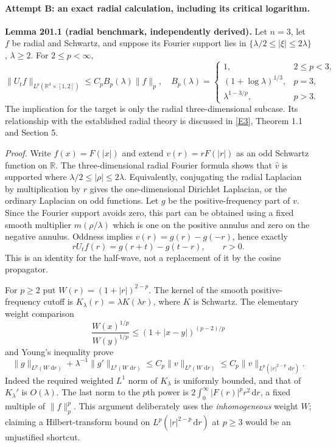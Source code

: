 \documentclass[11pt]{article}
\newcommand{\R}{\mathbb{R}}
\newcommand{\dd}{\,\mathrm d}
\newcommand{\eref}[2]{\hyperlink{extra:#1:#2}{[E#2]}}
\begin{document}
	\paragraph{Attempt B: an exact radial calculation, including its critical logarithm.}
	\textbf{Lemma 201.1 (radial benchmark, independently derived).}
	Let $n=3$, let $f$ be radial and Schwartz, and suppose its Fourier support
	lies in $\{\lambda/2\leq|\xi|\leq2\lambda\}$, $\lambda\geq2$.
	For $2\leq p<\infty$,
	\begin{equation}\label{ra30004844:radialbound}
		\|U_tf\|_{L^p(\R^3\times[1,2])}
		\leq C_p B_p(\lambda)\|f\|_p,
		\quad
		B_p(\lambda)=
		\begin{cases}
			1,&2\leq p<3,\\
			(1+\log\lambda)^{1/3},&p=3,\\
			\lambda^{1-3/p},&p>3.
		\end{cases}
	\end{equation}
	The implication for the target is only the radial three-dimensional
	subcase. Its relationship with the established radial theory is discussed
	in \eref{30004844}{3}, Theorem 1.1 and Section 5.
	
	\emph{Proof.}
	Write $f(x)=F(|x|)$ and extend $v(r)=rF(|r|)$ as an odd Schwartz
	function on $\R$. The three-dimensional radial Fourier formula shows
	that $\widehat v$ is supported where
	$\lambda/2\leq|\rho|\leq2\lambda$. Equivalently, conjugating the radial
	Laplacian by multiplication by $r$ gives the one-dimensional Dirichlet
	Laplacian, or the ordinary Laplacian on odd functions. Let $g$ be the
	positive-frequency part of $v$. Since the Fourier support avoids zero,
	this part can be obtained using a fixed smooth multiplier
	$m(\rho/\lambda)$ which is one on the positive annulus and zero on the
	negative annulus. Oddness implies $v(r)=g(r)-g(-r)$, hence exactly
	\begin{equation}\label{ra30004844:radialidentity}
		rU_tf(r)=g(r+t)-g(t-r),\qquad r>0.
	\end{equation}
	This is an identity for the half-wave, not a replacement of it by the
	cosine propagator.
	
	For $p\geq2$ put $W(r)=(1+|r|)^{2-p}$. The kernel of the smooth
	positive-frequency cutoff is $K_\lambda(r)=\lambda K(\lambda r)$,
	where $K$ is Schwartz. The elementary weight comparison
	\[
	\frac{W(x)^{1/p}}{W(y)^{1/p}}
	\leq (1+|x-y|)^{(p-2)/p}
	\]
	and Young's inequality prove
	\begin{equation}\label{ra30004844:weightedcutoff}
		\|g\|_{L^p(W\,\dd r)}+
		\lambda^{-1}\|g'\|_{L^p(W\,\dd r)}
		\leq C_p\|v\|_{L^p(W\,\dd r)}
		\leq C_p\|v\|_{L^p(|r|^{2-p}\,\dd r)}.
	\end{equation}
	Indeed the required weighted $L^1$ norm of $K_\lambda$ is uniformly
	bounded, and that of $K_\lambda'$ is $O(\lambda)$.
	The last norm to the $p$th power is
	$2\int_0^\infty |F(r)|^p r^2\dd r$, a fixed multiple of $\|f\|_p^p$.
	This argument deliberately uses the \emph{inhomogeneous} weight $W$;
	claiming a Hilbert-transform bound on $L^p(|r|^{2-p}\dd r)$ at $p\geq3$
	would be an unjustified shortcut.
	
\end{document}
